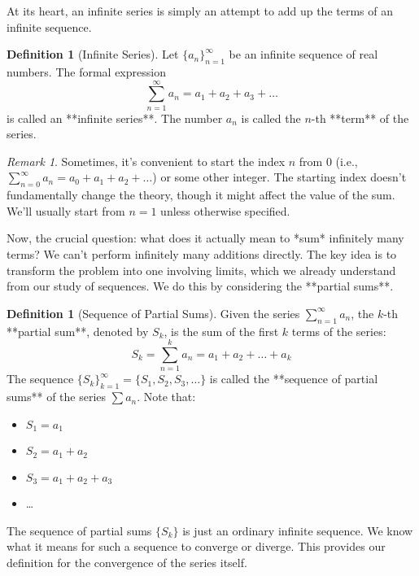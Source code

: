 \documentclass[11pt]{article}
\theoremstyle{definition}
\newtheorem{definition}[theorem]{Definition}
\theoremstyle{remark}
\newtheorem{remark}[theorem]{Remark}
\begin{document}
At its heart, an infinite series is simply an attempt to add up the terms of an infinite sequence.

\begin{definition}[Infinite Series]
Let $\{a_n\}_{n=1}^{\infty}$ be an infinite sequence of real numbers. The formal expression
\[ \sum_{n=1}^{\infty} a_n = a_1 + a_2 + a_3 + \dots \]
is called an **infinite series**. The number $a_n$ is called the $n$-th **term** of the series.
\end{definition}

\begin{remark}
Sometimes, it's convenient to start the index $n$ from $0$ (i.e., $\sum_{n=0}^{\infty} a_n = a_0 + a_1 + a_2 + \dots$) or some other integer. The starting index doesn't fundamentally change the theory, though it might affect the value of the sum. We'll usually start from $n=1$ unless otherwise specified.
\end{remark}

Now, the crucial question: what does it actually mean to *sum* infinitely many terms? We can't perform infinitely many additions directly. The key idea is to transform the problem into one involving limits, which we already understand from our study of sequences. We do this by considering the **partial sums**.

\begin{definition}[Sequence of Partial Sums]
Given the series $\sum_{n=1}^{\infty} a_n$, the $k$-th **partial sum**, denoted by $S_k$, is the sum of the first $k$ terms of the series:
\[ S_k = \sum_{n=1}^{k} a_n = a_1 + a_2 + \dots + a_k \]
The sequence $\{S_k\}_{k=1}^{\infty} = \{S_1, S_2, S_3, \dots\}$ is called the **sequence of partial sums** of the series $\sum a_n$.
Note that:
\begin{itemize}
    \item $S_1 = a_1$
    \item $S_2 = a_1 + a_2$
    \item $S_3 = a_1 + a_2 + a_3$
    \item \dots
\end{itemize}
\end{definition}

The sequence of partial sums $\{S_k\}$ is just an ordinary infinite sequence. We know what it means for such a sequence to converge or diverge. This provides our definition for the convergence of the series itself.
\end{document}
